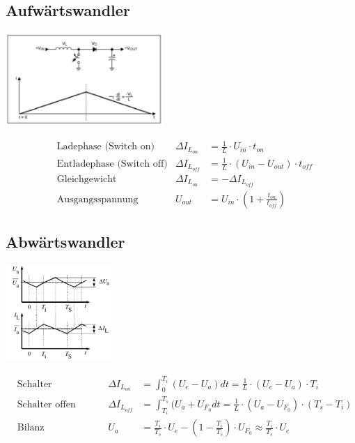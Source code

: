 \subsection{Aufwärtswandler}
	\begin{minipage}{6cm}
		\includegraphics[width=6cm]{./images/boost-Verhalten}
	\end{minipage}
	\begin{minipage}{12cm}
		\begin{align*}
			&\text{Ladephase (Switch on)} & \Delta I_{L_{on}} & = \frac{1}{L} \cdot U_{in} \cdot t_{on} \\
			&\text{Entladephase (Switch off)} & \Delta I_{L_{off}} & = \frac{1}{L} \cdot \left(U_{in}-U_{out}\right) \cdot t_{off} \\
			&\text{Gleichgewicht} & \Delta I_{L_{on}} & = -\Delta I_{L_{off}} \\
			&\text{Ausgangsspannung}	& U_{out} & = U_{in} \cdot \left( 1+\frac{t_{on}}{t_{off}}\right)
		\end{align*}
	\end{minipage}

\subsection{Abwärtswandler}
	\begin{minipage}{6cm}
		\includegraphics[width=4cm]{./images/buck-Verhalten}
	\end{minipage}
	\begin{minipage}{12cm}
		\begin{align*}
			&\text{Schalter geschlossen} & \Delta I_{L_{on}} &= \int_{0}^{T_i} (U_e - U_a) dt = \frac{1}{L} \cdot (U_e - U_a) \cdot T_i \\
			&\text{Schalter offen} & \Delta I_{L_{off}} &= \int_{T_i}^{T_s}(U_a + U_{F_0} dt = \frac{1}{L} \cdot (U_a - U_{F_0}) \cdot (T_s - T_i) \\
			&\text{Bilanz} & U_a &= \frac{T_i}{T_s} \cdot U_e - \left(1-\frac{T_i}{T_s} \right) \cdot U_{F_0} \approx \frac{T_i}{T_s} \cdot U_e
		\end{align*}
	\end{minipage}
	
